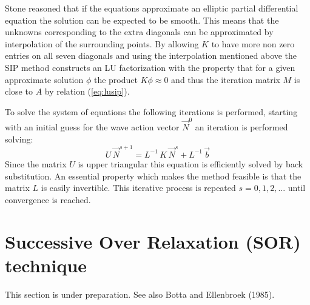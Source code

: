 \documentclass[12pt]{book}
\begin{document}
Stone reasoned that if the equations approximate an elliptic partial differential equation the
solution can be expected to be smooth. This means that the unknowns corresponding to
the extra diagonals can be approximated by interpolation of the surrounding points. By
allowing $K$ to have more non zero entries on all seven diagonals and using the interpolation
mentioned above the SIP method constructs an LU factorization with the property that for a
given approximate solution $\phi$ the product $K\phi \approx 0$ and thus the iteration matrix $M$ is close to
$A$ by relation (\ref{eq:lusip}).

To solve the system of equations the following iterations is performed,
starting with an initial guess for the wave action vector ${\vec{N}}^0$ an iteration is performed solving:
\begin{equation}
   U\,{\vec{N}}^{s+1}  = L^{-1}\,K\,{\vec{N}}^s + L^{-1}\,\vec{b}
\end{equation}
Since the matrix $U$ is upper triangular this equation is efficiently solved by back substitution.
An essential property which makes the method feasible is that the matrix $L$ is easily
invertible. This iterative process is repeated $s=0,1,2,...$ until convergence is reached.

\section{Successive Over Relaxation (SOR) technique}
This section is under preparation.
See also Botta and Ellenbroek (1985).

 \label{ch:parall}
\end{document}
